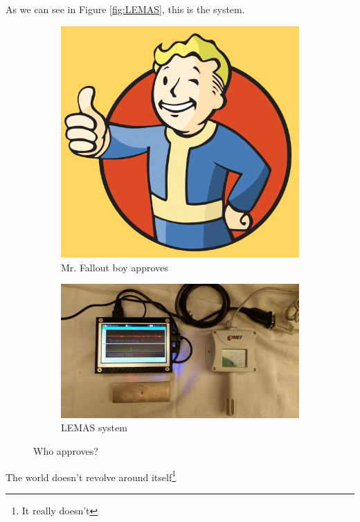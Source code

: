 \documentclass{proc}
\begin{document}
  As we can see in Figure \ref{fig:LEMAS}, this is the system.

  \begin{figure}
    \centering
    \begin{subfigure}{0.3\linewidth}
      \includegraphics[width=\linewidth]{figures/fallout.jpeg}
      \caption{Mr. Fallout boy approves}
    \end{subfigure}
    \begin{subfigure}{0.5\linewidth}
      \includegraphics[width=\linewidth]{figures/index.jpeg}
      \caption{LEMAS system}
      \label{fig:2}
    \end{subfigure}
    \caption{Who approves?}
  \end{figure}

  The world doesn't revolve around itself\footnote{\label{foot1}It really doesn't}
\end{document}

